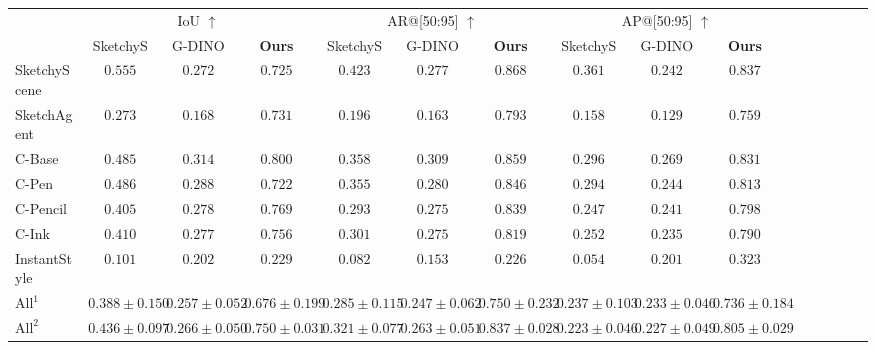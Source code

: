 \begin{table*}

\begin{tabular}{l | c c c | c c c | c c c | c c c | c c c} 
    \toprule
    &
    \multicolumn{3}{c|}{IoU $\uparrow$} & \multicolumn{3}{c|}{AR@[50:95] $\uparrow$} & \multicolumn{3}{c|}{AP@[50:95] $\uparrow$} \\
    &  SketchyS & G-DINO & \textbf{Ours} & SketchyS & G-DINO & \textbf{Ours} & SketchyS & G-DINO & \textbf{Ours} \\
    \midrule
    SketchyScene & $0.555$ & $ 0.272 $ & $0.725$ & $0.423$ & $0.277$ & $0.868$ & $0.361$ & $0.242$ & $0.837$  \\
    SketchAgent & $0.273$ & $0.168$ & $0.731$ & $0.196$ & $0.163$ & $0.793$ & $0.158$ & $0.129$ & $0.759$  \\
    C-Base & $0.485$ & $0.314$ & $0.800$ & $0.358$ & $0.309$ & $0.859$ & $0.296$ & $0.269$ & $0.831$  \\
    C-Pen & $0.486$ & $0.288$ & $0.722$ & $0.355$ & $0.280$ & $0.846$ & $0.294$ & $0.244$ & $0.813$  \\
    C-Pencil & $0.405$ & $0.278$ & $0.769$ & $0.293$ & $0.275$ & $0.839$ & $0.247$ & $0.241$ & $0.798$  \\
    C-Ink & $0.410$ & $0.277$ & $0.756$ & $0.301$ & $0.275$ & $0.819$ & $0.252$ & $0.235$ & $0.790$  \\
    InstantStyle & $0.101$ & $0.202$ & $0.229$ & $0.082$ & $0.153$ & $0.226$ & $0.054$ & $0.201$ & $0.323$ \\
    \midrule
    $\text{All}^1$ & $	0.388\pm 0.150 $ & $0.257 \pm 0.052$ & $0.676\pm 0.199$ & $0.285 \pm 0.115$ & $0.247 \pm 0.062$ & $0.750 \pm 0.232$ & $0.237 \pm 0.103$ & $0.233 \pm 0.046$ & $0.736 \pm 0.184$  \\
    $\text{All}^2$ & $	0.436\pm 0.097$ & $0.266 \pm 0.050$ & $0.750\pm 0.031$ & $0.321 \pm 0.077$ & $0.263 \pm 0.051$ & $0.837 \pm 0.028$ & $0.223 \pm 0.046$ & $0.227 \pm 0.049$ & $0.805 \pm 0.029$  \\
    \bottomrule
\end{tabular}
\end{table*}

